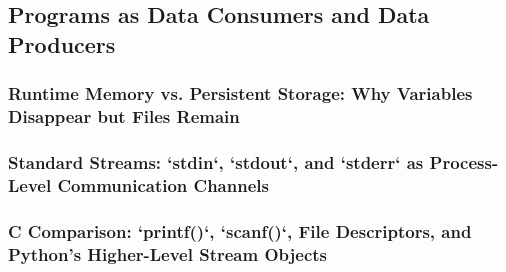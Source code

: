 \subsection{Programs as Data Consumers and Data Producers}
\subsubsection{Runtime Memory vs. Persistent Storage: Why Variables Disappear but Files Remain}
\subsubsection{Standard Streams: `stdin`, `stdout`, and `stderr` as Process-Level Communication Channels}
\subsubsection{C Comparison: `printf()`, `scanf()`, File Descriptors, and Python’s Higher-Level Stream Objects}

